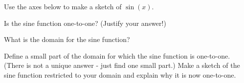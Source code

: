 
\begin{problem}
\item Use the axes below to make a sketch of $\sin(x)$.

  \scalebox{0.65}{}

  \begin{subproblem}
    \item Is the sine function one-to-one? (Justify your answer!)
    \vspace{3em}
    \item What is the domain for the sine function?
    \vspace{1em}
    \item Define a small part of the domain for which the sine
    function is one-to-one. (There is not a unique answer - just find
    one small part.)  Make a sketch of the sine function restricted to
    your domain and explain why it is now one-to-one.

    \vfill

  \end{subproblem}

\end{problem}


